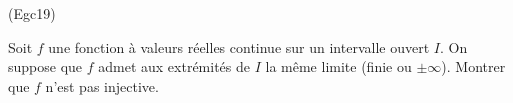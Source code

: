 \begin{tiny}(Egc19)\end{tiny} Soit $f$ une fonction à valeurs réelles continue sur un intervalle ouvert $I$. On suppose que $f$ admet aux extrémités de $I$ la même limite (finie ou $\pm \infty$). Montrer que $f$ n'est pas injective.  